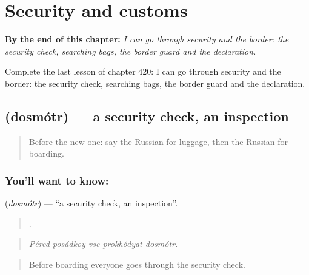 
\chapter{Security and customs}
\label{ch:ru-security-and-customs}

\begin{chapteropening}
\textbf{By the end of this chapter:} \emph{I can go through security and the border: the security check, searching bags, the border guard and the declaration.}

Complete the last lesson of chapter 420: I can go through security and the border: the security check, searching bags, the border guard and the declaration.
\end{chapteropening}

\section[\texorpdfstring{\ru{досмотр} (dosmótr)}{досмотр (dosmótr)}]{ (dosmótr) — a security check, an inspection}

\label{lesson:RU-C420-dosmotr}



\begin{quote}
Before the new one: say the Russian for luggage, then the Russian for boarding.
\end{quote}

\subsection*{You'll want to know: }
\textbf{} (\emph{dosmótr}) — \textquotedblleft{}a security check, an inspection\textquotedblright{}.

\begin{quote}
    .
\end{quote}

\begin{quote}
\emph{Péred posádkoy vse prokhódyat dosmótr.}
\end{quote}

\begin{quote}
Before boarding everyone goes through the security check.
\end{quote}

